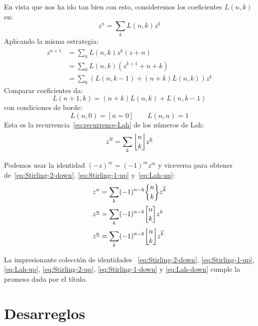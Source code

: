   En vista que nos ha ido tan bien con esto,
  consideremos los coeficientes \(L(n, k)\) en:
  \begin{equation*}
    z^{\overline{n}}
      = \sum_k L(n, k) z^{\underline{k}}
  \end{equation*}
  Aplicando la misma estrategia:
  \begin{align*}
    z^{\overline{n + 1}}
      &= \sum_k L(n, k) z^{\underline{k}} (z + n) \\
      &= \sum_k L(n, k) (z^{\underline{k + 1}} + n + k) \\
      &= \sum_k (L(n, k - 1) + (n + k) L(n, k)) z^{\underline{k}}
  \end{align*}
  Comparar coeficientes da:
  \begin{equation*}
    L(n + 1, k)
      = (n + k) L(n, k) + L(n, k - 1)
  \end{equation*}
  con condiciones de borde:
  \begin{equation*}
    L(n, 0) = [n = 0] \qquad L(n, n) = 1
  \end{equation*}
  Esta es la recurrencia~\eqref{eq:recurrence-Lah}
  de los números de Lah:
  \begin{equation}
    \label{eq:Lah-up}
    z^{\overline{n}}
      = \sum_k \lah{n}{k} z^{\underline{k}}
  \end{equation}

  Podemos usar
  la identidad \((-z)^{\underline{m}} = (-1)^m z^{\overline{m}}\)
  y viceversa para obtener de~\eqref{eq:Stirling-2-down},
  \eqref{eq:Stirling-1-up}
  y~\eqref{eq:Lah-up}:
  \begin{align}
    z^n
      &= \sum_k (-1)^{n - k} \classes{n}{k} z^{\overline{k}}
	      \label{eq:Stirling-2-up} \\
    z^{\underline{n}}
      &= \sum_k (-1)^{n - k} \cycle{n}{k} z^k
	      \label{eq:Stirling-1-down} \\
    z^{\underline{n}}
      &= \sum_k (-1)^{n - k} \lah{n}{k} z^{\overline{k}}
	      \label{eq:Lah-down}
  \end{align}

  La impresionante colección de identidades~%
    \eqref{eq:Stirling-2-down},
    \eqref{eq:Stirling-1-up},
    \eqref{eq:Lah-up},
    \eqref{eq:Stirling-2-up},
    \eqref{eq:Stirling-1-down}
    y \eqref{eq:Lah-down}
  cumple la promesa dada por el título.

\section{Desarreglos}
\label{sec:desarreglos}

